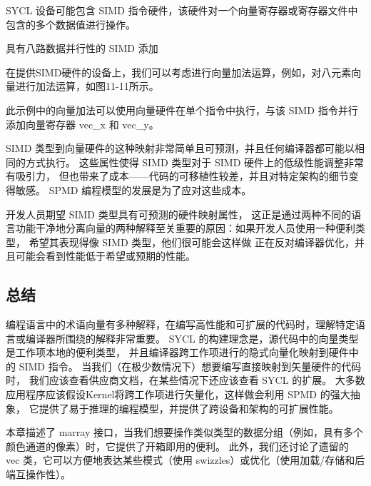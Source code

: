 SYCL 设备可能包含 SIMD 指令硬件，该硬件对一个向量寄存器或寄存器文件中包含的多个数据值进行操作。

{\color{red} 具有八路数据并行性的 SIMD 添加}

在提供SIMD硬件的设备上，我们可以考虑进行向量加法运算，例如，对八元素向量进行加法运算，如图11-11所示。

此示例中的向量加法可以使用向量硬件在单个指令中执行，与该 SIMD 指令并行添加向量寄存器 vec\_x 和 vec\_y。

SIMD 类型到向量硬件的这种映射非常简单且可预测，并且任何编译器都可能以相同的方式执行。 
这些属性使得 SIMD 类型对于 SIMD 硬件上的低级性能调整非常有吸引力，
但也带来了成本——代码的可移植性较差，并且对特定架构的细节变得敏感。 SPMD 编程模型的发展是为了应对这些成本。

开发人员期望 SIMD 类型具有可预测的硬件映射属性，
这正是通过两种不同的语言功能干净地分离向量的两种解释至关重要的原因：如果开发人员使用一种便利类型，
希望其表现得像 SIMD 类型，他们很可能会这样做 正在反对编译器优化，并且可能会看到性能低于希望或预期的性能。

\subsection{总结}
编程语言中的术语向量有多种解释，在编写高性能和可扩展的代码时，理解特定语言或编译器所围绕的解释非常重要。 
SYCL 的构建理念是，源代码中的向量类型是工作项本地的便利类型，
并且编译器跨工作项进行的隐式向量化映射到硬件中的 SIMD 指令。 
当我们（在极少数情况下）想要编写直接映射到矢量硬件的代码时，
我们应该查看供应商文档，在某些情况下还应该查看 SYCL 的扩展。 
大多数应用程序应该假设Kernel将跨工作项进行矢量化，这样做会利用 SPMD 的强大抽象，
它提供了易于推理的编程模型，并提供了跨设备和架构的可扩展性能。

本章描述了 marray 接口，当我们想要操作类似类型的数据分组（例如，具有多个颜色通道的像素）时，它提供了开箱即用的便利。 
此外，我们还讨论了遗留的 vec 类，它可以方便地表达某些模式（使用 swizzles）或优化（使用加载/存储和后端互操作性）。